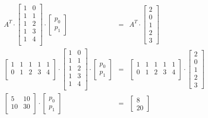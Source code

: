 \documentclass{article}
\begin{document}
				\begin{eqnarray*}
					A^T \cdot \begin{bmatrix}
						1 & 0 \\ 1 & 1 \\ 1 & 2 \\ 1 & 3 \\ 1 & 4 \\
					\end{bmatrix} \cdot \begin{bmatrix}
						p_0 \\ p_1
					\end{bmatrix} &=& A^T \cdot \begin{bmatrix} 2 \\ 0 \\ 1 \\ 2 \\ 3 \end{bmatrix} \\
					\begin{bmatrix}
						1 & 1 & 1 & 1 & 1 \\
						0 & 1 & 2 & 3 & 4 \\
					\end{bmatrix}\cdot \begin{bmatrix}
						1 & 0 \\ 1 & 1 \\ 1 & 2 \\ 1 & 3 \\ 1 & 4 \\
					\end{bmatrix} \cdot \begin{bmatrix}
						p_0 \\ p_1
					\end{bmatrix} &=& \begin{bmatrix}
					1 & 1 & 1 & 1 & 1 \\
					0 & 1 & 2 & 3 & 4 \\
					\end{bmatrix} \cdot \begin{bmatrix} 2 \\ 0 \\ 1 \\ 2 \\ 3 \end{bmatrix} \\
					\begin{bmatrix}
						5 & 10 \\ 10 & 30 \\
					\end{bmatrix} \cdot \begin{bmatrix}
					p_0 \\ p_1
					\end{bmatrix} &=& \begin{bmatrix} 8 \\ 20 \end{bmatrix}
				\end{eqnarray*}
\end{document}
